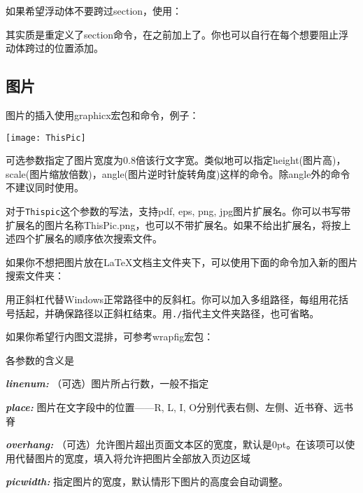 {如果希望浮动体不要跨过section，使用：
\begin{latex}{}
\usepackage[section]{placeins}
\end{latex}

其实质是重定义了section命令，在之前加上了\latexline{\\FloatBarrier}。你也可以自行在每个想要阻止浮动体跨过的位置添加。

\subsection{图片}
图片的插入使用graphicx宏包和命令，例子：
\begin{latex}{}
\begin{center}
  \texttt{[image: ThisPic]}
\end{center}
\end{latex}

可选参数指定了图片宽度为0.8倍该行文字宽。类似地可以指定height(图片高)，scale(图片缩放倍数)，angle(图片逆时针旋转角度)这样的命令。除angle外的命令不建议同时使用。

对于\texttt{Thispic}这个参数的写法，\xelatex 支持pdf, eps, png, jpg图片扩展名。你可以书写带扩展名的图片名称ThisPic.png，也可以不带扩展名。如果不给出扩展名，将按上述四个扩展名的顺序依次搜索文件。\dpar

如果你不想把图片放在\LaTeX 文档主文件夹下，可以使用下面的命令加入新的图片搜索文件夹：
\begin{latex}{}
\graphicspath{{c:/pics/}{./pic/}}
\end{latex}

用正斜杠代替Windows正常路径中的反斜杠。你可以加入多组路径，每组用花括号括起，并确保路径以正斜杠结束。用\verb|./|指代主文件夹路径，也可省略。\dpar

如果你希望行内图文混排，可参考wrapfig宏包：
\begin{latex}{}
\end{latex}

各参数的含义是
\begin{inlinee}
\item {\bfseries\itshape linenum:} （可选）图片所占行数，一般不指定
\item {\bfseries\itshape place:} 图片在文字段中的位置——R, L, I, O分别代表右侧、左侧、近书脊、远书脊
\item {\bfseries\itshape overhang:} （可选）允许图片超出页面文本区的宽度，默认是0pt。在该项可以使用\latexline{\\width}代替图片的宽度，填入\latexline{\\width}将允许把图片全部放入页边区域
\item {\bfseries\itshape picwidth:} 指定图片的宽度，默认情形下图片的高度会自动调整。
\end{inlinee}

}
